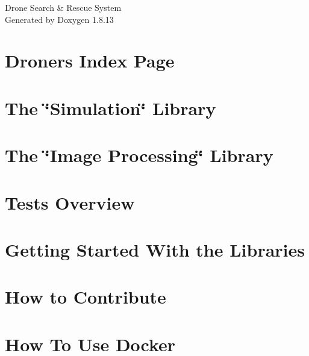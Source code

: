 \documentclass[twoside]{book}
\newcommand{\+}{\discretionary{\mbox{\scriptsize$\hookleftarrow$}}{}{}}
\newcommand{\clearemptydoublepage}{%
  \newpage{\pagestyle{empty}\cleardoublepage}%
}
\begin{document}
\hypersetup{pageanchor=false,
             bookmarksnumbered=true,
             pdfencoding=unicode
            }
\begin{titlepage}
\vspace*{7cm}
\begin{center}%
{\Large Drone Search \& Rescue System }\\
\vspace*{1cm}
{\large Generated by Doxygen 1.8.13}\\
\end{center}
\end{titlepage}
\clearemptydoublepage
{}
\tableofcontents
\clearemptydoublepage
{}
\hypersetup{pageanchor=true}

\chapter{Droners Index Page}
\label{index}\hypertarget{index}{}
\chapter{The \char`\"{}\+Simulation\char`\"{} Library}
\label{simulation_description}

\chapter{The \char`\"{}\+Image Processing\char`\"{} Library}
\label{image_processing_description}

\chapter{Tests Overview}
\label{tests_description}

\chapter{Getting Started With the Libraries}
\label{getting_started}

\chapter{How to Contribute}
\label{how_to_contribute}

\chapter{How To Use Docker}
\label{how_to_use_docker}

\end{document}
